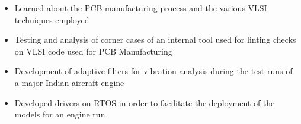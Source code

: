 \begin{itemize}
\item Learned about the PCB manufacturing process and the various VLSI techniques employed
\item Testing and analysis of corner cases of an internal tool used for linting checks on VLSI code used for PCB Manufacturing
\end{itemize}

\divider

\begin{itemize}
\item Development of adaptive filters for vibration analysis during the test runs of a major Indian aircraft engine
\item Developed drivers on RTOS in order to facilitate the deployment of the models for an engine run

\end{itemize}
